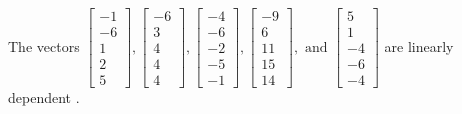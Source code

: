 \begin{exercise}
\begin{exerciseStatement}
  \end{exerciseStatement}
  \begin{exerciseAnswer}
   The vectors \(\left[\begin{array}{r}
-1 \\
-6 \\
1 \\
2 \\
5
\end{array}\right] , \left[\begin{array}{r}
-6 \\
3 \\
4 \\
4 \\
4
\end{array}\right] , \left[\begin{array}{r}
-4 \\
-6 \\
-2 \\
-5 \\
-1
\end{array}\right] , \left[\begin{array}{r}
-9 \\
6 \\
11 \\
15 \\
14
\end{array}\right] , \text{ and } \left[\begin{array}{r}
5 \\
1 \\
-4 \\
-6 \\
-4
\end{array}\right]\) are 
  	 linearly dependent  .
  


  \end{exerciseAnswer}
\end{exercise}